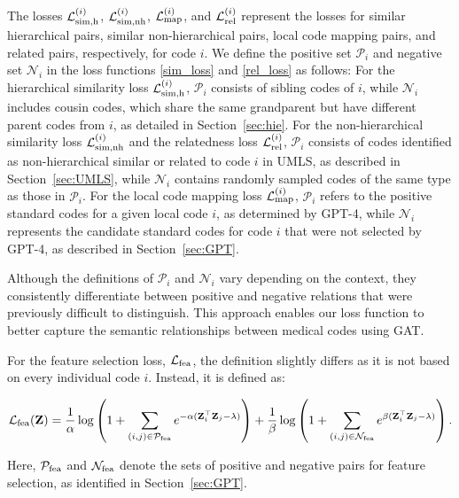 \documentclass{article}
\begin{document}
The losses $\mathcal{L}^{(i)}_{\rm sim,h}$, $\mathcal{L}^{(i)}_{\rm sim,nh}$, $\mathcal{L}^{(i)}_{\rm map}$, and $\mathcal{L}^{(i)}_{\rm rel}$ represent the losses for similar hierarchical pairs, similar non-hierarchical pairs, local code mapping pairs, and related pairs, respectively, for code $i$. We define the positive set \(\mathcal{P}_i\) and negative set \(\mathcal{N}_i\) in the loss functions \eqref{sim_loss} and \eqref{rel_loss} as follows:
For the hierarchical similarity loss $\mathcal{L}^{(i)}_{\rm sim,h}$, \(\mathcal{P}_i\) consists of sibling codes of $i$, while \(\mathcal{N}_i\) includes cousin codes, which share the same grandparent but have different parent codes from $i$, as detailed in Section~\ref{sec:hie}.
For the non-hierarchical similarity loss $\mathcal{L}^{(i)}_{\rm sim,nh}$ and the relatedness loss $\mathcal{L}^{(i)}_{\rm rel}$, \(\mathcal{P}_i\) consists of codes identified as non-hierarchical similar or related to code $i$ in UMLS, as described in Section~\ref{sec:UMLS}, while \(\mathcal{N}_i\) contains randomly sampled codes of the same type as those in \(\mathcal{P}_i\).
For the local code mapping loss $\mathcal{L}^{(i)}_{\rm map}$, \(\mathcal{P}_i\) refers to the positive standard codes for a given local code $i$, as determined by GPT-4, while \(\mathcal{N}_i\) represents the candidate standard codes for code $i$ that were not selected by GPT-4, as described in Section~\ref{sec:GPT}.

Although the definitions of \(\mathcal{P}_i\) and \(\mathcal{N}_i\) vary depending on the context, they consistently differentiate between positive and negative relations that were previously difficult to distinguish. This approach enables our loss function to better capture the semantic relationships between medical codes using GAT.

For the feature selection loss, \(\mathcal{L}_{\rm fea}\), the definition slightly differs as it is not based on every individual code $i$. Instead, it is defined as:

\begin{equation}
\mathcal{L}_{\rm fea}(\mathbf{Z}) = \frac{1}{\alpha} \log \left( 1 + \sum_{(i,j) \in \mathcal{P}_{\rm fea}} e^{-\alpha (\mathbf{Z}_i^\top \mathbf{Z}_j - \lambda)} \right) + \frac{1}{\beta}\log \left( 1 + \sum_{(i,j) \in \mathcal{N}_{\rm fea}} e^{\beta (\mathbf{Z}_i^\top \mathbf{Z}_j - \lambda)} \right). 
\label{M_S_2} 
\end{equation}

Here, $\mathcal{P}_{\rm fea}$ and $\mathcal{N}_{\rm fea}$ denote the sets of positive and negative pairs for feature selection, as identified in Section~\ref{sec:GPT}.
\end{document}
